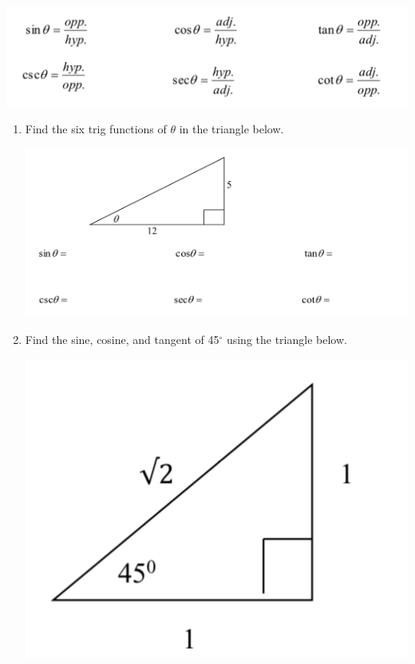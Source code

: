 \documentclass[11pt]{article}
\begin{document}
\begin{center}
\includegraphics[scale=.6]{trigdef}\\
\end{center}

\newpage





\begin{enumerate}
\item Find the six trig functions of $\theta$ in the triangle below.
\begin{center}
\includegraphics[scale=.6]{trigex1}\\
\end{center}

\item Find the sine, cosine, and tangent of 45$^{\circ}$ using the triangle below.

\includegraphics[scale=.6]{trigex2}\\



\end{enumerate}
\end{document}
